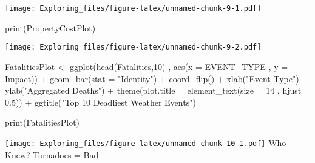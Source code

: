 \documentclass[
]{article}
\newenvironment{Shaded}{\begin{snugshade}}{\end{snugshade}}
\newcommand{\AttributeTok}[1]{\textcolor[rgb]{0.77,0.63,0.00}{#1}}
\newcommand{\DecValTok}[1]{\textcolor[rgb]{0.00,0.00,0.81}{#1}}
\newcommand{\FloatTok}[1]{\textcolor[rgb]{0.00,0.00,0.81}{#1}}
\newcommand{\FunctionTok}[1]{\textcolor[rgb]{0.00,0.00,0.00}{#1}}
\newcommand{\NormalTok}[1]{#1}
\newcommand{\OtherTok}[1]{\textcolor[rgb]{0.56,0.35,0.01}{#1}}
\newcommand{\SpecialCharTok}[1]{\textcolor[rgb]{0.00,0.00,0.00}{#1}}
\newcommand{\StringTok}[1]{\textcolor[rgb]{0.31,0.60,0.02}{#1}}
\begin{document}
\texttt{[image: Exploring\_files/figure-latex/unnamed-chunk-9-1.pdf]}

\begin{Shaded}
\begin{Highlighting}[]
\FunctionTok{print}\NormalTok{(PropertyCostPlot)}
\end{Highlighting}
\end{Shaded}

\texttt{[image: Exploring\_files/figure-latex/unnamed-chunk-9-2.pdf]}

\begin{Shaded}
\begin{Highlighting}[]
\NormalTok{FatalitiesPlot }\OtherTok{\textless{}{-}} \FunctionTok{ggplot}\NormalTok{(}\FunctionTok{head}\NormalTok{(Fatalities,}\DecValTok{10}\NormalTok{)}
\NormalTok{                      , }\FunctionTok{aes}\NormalTok{(}\AttributeTok{x =}\NormalTok{ EVENT\_TYPE}
\NormalTok{                          , }\AttributeTok{y =}\NormalTok{ Impact)) }\SpecialCharTok{+}
                \FunctionTok{geom\_bar}\NormalTok{(}\AttributeTok{stat =} \StringTok{"Identity"}\NormalTok{) }\SpecialCharTok{+} 
                \FunctionTok{coord\_flip}\NormalTok{() }\SpecialCharTok{+}
                \FunctionTok{xlab}\NormalTok{(}\StringTok{"Event Type"}\NormalTok{) }\SpecialCharTok{+} 
                \FunctionTok{ylab}\NormalTok{(}\StringTok{"Aggregated Deaths"}\NormalTok{) }\SpecialCharTok{+} 
                \FunctionTok{theme}\NormalTok{(}\AttributeTok{plot.title =} \FunctionTok{element\_text}\NormalTok{(}\AttributeTok{size =} \DecValTok{14}
\NormalTok{                                                , }\AttributeTok{hjust =} \FloatTok{0.5}\NormalTok{)) }\SpecialCharTok{+} 
                \FunctionTok{ggtitle}\NormalTok{(}\StringTok{"Top 10 Deadliest Weather Events"}\NormalTok{)}


\FunctionTok{print}\NormalTok{(FatalitiesPlot)}
\end{Highlighting}
\end{Shaded}

\texttt{[image: Exploring\_files/figure-latex/unnamed-chunk-10-1.pdf]}
Who Knew? Tornadoes = Bad
\end{document}
